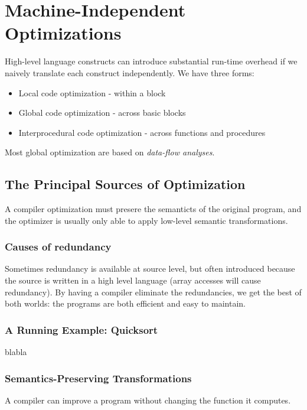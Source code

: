 \documentclass{article}
\begin{document}


\section{Machine-Independent Optimizations} %
\label{sec:Machine-Independent Optimizations}
High-level language constructs can introduce substantial run-time overhead if we naively translate each construct independently. We have three forms:
\begin{itemize}
	\item Local code optimization - within a block
	\item Global code optimization - across basic blocks
	\item Interprocedural code optimization - across functions and procedures
\end{itemize}
Most global optimization are based on \emph{data-flow analyses}.

\subsection{The Principal Sources of Optimization} %
\label{sub:The Principal Sources of Optimization}
A compiler optimization must presere the semanticts of the original program, and the optimizer is usually only able to apply low-level semantic transformations.

\subsubsection{Causes of redundancy} %
\label{ssub:Causes of redundancy}
Sometimes redundancy is available at source level, but often introduced because the source is written in a high level language (array accesses will cause redundancy). By having a compiler eliminate the redundancies, we get the best of both worlds: the programs are both efficient and easy to maintain.

\subsubsection{A Running Example: Quicksort} %
\label{ssub:A Running Example: Quicksort}
blabla

\subsubsection{Semantics-Preserving Transformations} %
\label{ssub:Semantics-Preserving Transformations}
A compiler can improve a program without changing the function it computes.
\end{document}
